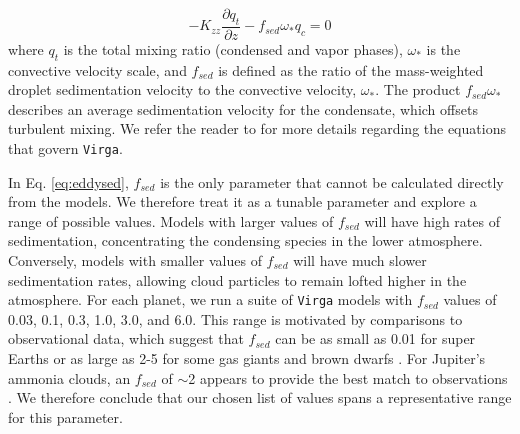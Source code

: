 \documentclass[twocolumn]{aastex63}
\begin{document}
\begin{equation}
    -K_{zz} \frac{\partial q_t}{\partial z} - f_{sed} \omega_* q_c = 0
    \label{eq:eddysed}
\end{equation}
where $q_t$ is the total mixing ratio (condensed and vapor phases), $\omega_*$ is the convective velocity scale, and $f_{sed}$ is defined as the ratio of the mass-weighted droplet sedimentation velocity to  the convective velocity, $\omega_*$. The product $f_{sed} \omega_*$ describes an average sedimentation velocity for the condensate, which offsets turbulent mixing.  We refer the reader to \citet{ackerman2001} for more details regarding the equations that govern \texttt{Virga}. 



In Eq. \ref{eq:eddysed}, $f_{sed}$ is the only parameter that cannot be calculated directly from the models.  We therefore treat it as a tunable parameter and explore a range of possible values. Models with larger values of $f_{sed}$ will have high rates of sedimentation, concentrating the condensing species in the lower atmosphere. Conversely, models with smaller values of $f_{sed}$ will have much slower sedimentation rates, allowing cloud particles to remain lofted higher in the atmosphere. 
For each planet, we run a suite of \texttt{Virga} models with $f_{sed}$ values of 0.03, 0.1, 0.3, 1.0, 3.0, and 6.0. This range is motivated by comparisons to observational data, which suggest that $f_{sed}$ can be as small as 0.01 for super Earths \citep[][]{morley2015} or as large as 2-5 for some gas giants and brown dwarfs \citep{skemer2016,macdonald2018,saumon2008}. For Jupiter's ammonia clouds, an $f_{sed}$ of $\sim$2 appears to provide the best match to observations \citep[][]{ackerman2001}. We therefore conclude that our chosen list of values spans a representative range for this parameter. 
\end{document}

